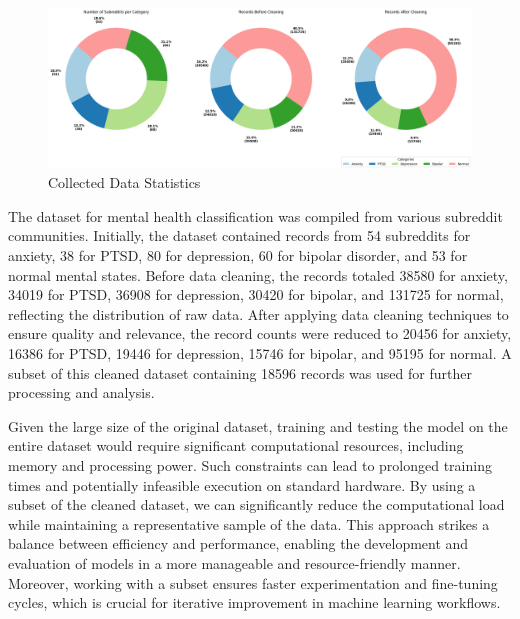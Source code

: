 
\begin{figure}[h!]  
    \centering
    \includegraphics[width=1.0\textwidth]{Images/Data Collection Graph.png}  
    \caption{Collected Data Statistics}
    \label{LSTMROC7uyiut11}  %
\end{figure}

\noindent
The dataset for mental health classification was compiled from various subreddit communities. Initially, the dataset contained records from 54 subreddits for anxiety, 38 for PTSD, 80 for depression, 60 for bipolar disorder, and 53 for normal mental states. Before data cleaning, the records totaled 38580 for anxiety, 34019 for PTSD, 36908 for depression, 30420 for bipolar, and 131725 for normal, reflecting the distribution of raw data. After applying data cleaning techniques to ensure quality and relevance, the record counts were reduced to 20456 for anxiety, 16386 for PTSD, 19446 for depression, 15746 for bipolar, and 95195 for normal. A subset of this cleaned dataset containing 18596 records was used for further processing and analysis.

\vspace{1em}

\noindent
Given the large size of the original dataset, training and testing the model on the entire dataset would require significant computational resources, including memory and processing power. Such constraints can lead to prolonged training times and potentially infeasible execution on standard hardware. By using a subset of the cleaned dataset, we can significantly reduce the computational load while maintaining a representative sample of the data. This approach strikes a balance between efficiency and performance, enabling the development and evaluation of models in a more manageable and resource-friendly manner. Moreover, working with a subset ensures faster experimentation and fine-tuning cycles, which is crucial for iterative improvement in machine learning workflows.

